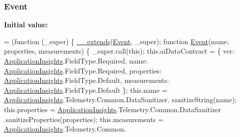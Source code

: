 \subsubsection[{\texorpdfstring{Event}{Event}}]{ Event}\hypertarget{obj_2_release_2_package_2_package_tmp_2_scripts_2ai_80_822_89-build00167_8js_aed01caf943a868f8e12e0420da8fa542}{}\label{obj_2_release_2_package_2_package_tmp_2_scripts_2ai_80_822_89-build00167_8js_aed01caf943a868f8e12e0420da8fa542}
{\bfseries Initial value\+:}
\begin{DoxyCode}
= (\textcolor{keyword}{function} (\_super) \{
                \hyperlink{obj_2_release_2_package_2_package_tmp_2_scripts_2ai_80_822_89-build00167_8js_ac09f4951ac4b25df0272d4e78ff85ae0}{\_\_extends}(\hyperlink{obj_2_release_2_package_2_package_tmp_2_scripts_2ai_80_822_89-build00167_8js_aed01caf943a868f8e12e0420da8fa542}{Event}, \_super);
                \textcolor{keyword}{function} \hyperlink{obj_2_release_2_package_2_package_tmp_2_scripts_2ai_80_822_89-build00167_8js_aed01caf943a868f8e12e0420da8fa542}{Event}(name, properties, measurements) \{
                    \_super.call(\textcolor{keyword}{this});
                    this.aiDataContract = \{
                        ver: \hyperlink{obj_2_release_2_package_2_package_tmp_2_scripts_2ai_80_822_89-build00167_8js_aa415ef4f8cdd699689ef4b61db7656d8}{ApplicationInsights}.FieldType.Required,
                        name: \hyperlink{obj_2_release_2_package_2_package_tmp_2_scripts_2ai_80_822_89-build00167_8js_aa415ef4f8cdd699689ef4b61db7656d8}{ApplicationInsights}.FieldType.Required,
                        properties: \hyperlink{obj_2_release_2_package_2_package_tmp_2_scripts_2ai_80_822_89-build00167_8js_aa415ef4f8cdd699689ef4b61db7656d8}{ApplicationInsights}.FieldType.Default,
                        measurements: \hyperlink{obj_2_release_2_package_2_package_tmp_2_scripts_2ai_80_822_89-build00167_8js_aa415ef4f8cdd699689ef4b61db7656d8}{ApplicationInsights}.FieldType.Default
                    \};
                    this.name = \hyperlink{obj_2_release_2_package_2_package_tmp_2_scripts_2ai_80_822_89-build00167_8js_aa415ef4f8cdd699689ef4b61db7656d8}{ApplicationInsights}.Telemetry.Common.DataSanitizer.
      sanitizeString(name);
                    this.properties = \hyperlink{obj_2_release_2_package_2_package_tmp_2_scripts_2ai_80_822_89-build00167_8js_aa415ef4f8cdd699689ef4b61db7656d8}{ApplicationInsights}.Telemetry.Common.DataSanitizer
      .sanitizeProperties(properties);
                    this.measurements = \hyperlink{obj_2_release_2_package_2_package_tmp_2_scripts_2ai_80_822_89-build00167_8js_aa415ef4f8cdd699689ef4b61db7656d8}{ApplicationInsights}.Telemetry.Common.

\end{DoxyCode}
